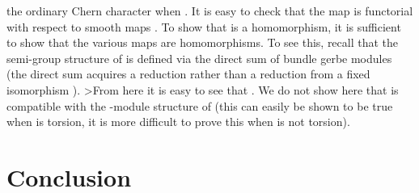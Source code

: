 \documentclass[a4paper,reqno]{amsart}
\theoremstyle{plain}
\theoremstyle{definition}
\theoremstyle{remark}
\numberwithin{equation}{section}
\numberwithin{figure}{section}
\providecommand{\<}{\langle}
\renewcommand{\>}{\rangle}
\begin{document}
the ordinary Chern character when \coordHE{}.  
It is easy to check that the map \coordHE{}   
is functorial with respect to smooth maps 
\coordHE{}.  To show that \coordHE{} is a 
homomorphism, it is sufficient to show that the various  
maps \coordHE{} are homomorphisms.  To see this,   
recall that the semi-group 
structure of \coordHE{} 
is defined via the direct sum of \coordHE{} bundle gerbe 
modules (the direct sum \coordHE{} acquires a 
\coordHE{} reduction rather than a \coordHE{} 
reduction from a fixed isomorphism 
\coordHE{}).  
>From here it is easy to see that \coordHE{}.  We do not show here 
that \coordHE{} is compatible with the \coordHE{}-module 
structure of \coordHE{} (this can easily be 
shown to be true when \myHighlight{$[H]$}\coordHE{} is torsion, it is more 
difficult to prove this when \myHighlight{$[H]$}\coordHE{} is not torsion).  


\section{Conclusion}
\end{document}
